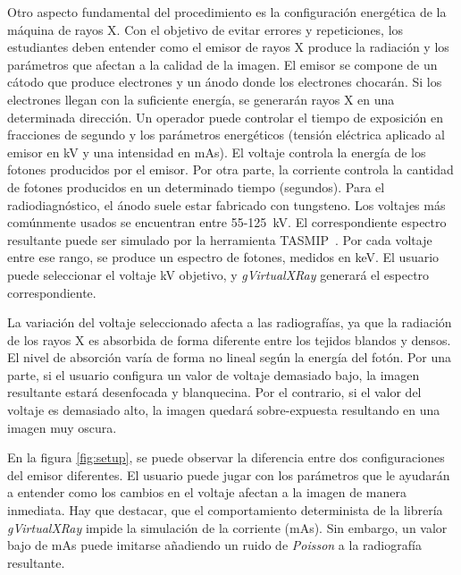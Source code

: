 Otro aspecto fundamental del procedimiento es la configuración energética de la máquina de rayos X. Con el objetivo de evitar errores y repeticiones, los estudiantes deben entender como el emisor de rayos X produce la radiación y los  parámetros que afectan a la calidad de la imagen. El emisor se compone de un cátodo que produce electrones y un ánodo donde los electrones chocarán. Si los electrones llegan con la suficiente energía, se generarán rayos X en una determinada dirección. Un operador puede controlar el tiempo de exposición en fracciones de segundo y los parámetros energéticos (tensión eléctrica aplicado al emisor en \ac{kV} y una intensidad en \ac{mAs}). El voltaje controla la energía de los fotones producidos por el emisor. Por otra parte, la corriente controla la cantidad de fotones producidos en un determinado tiempo (segundos). 
Para el radiodiagnóstico, el ánodo suele estar fabricado con tungsteno. Los voltajes más comúnmente usados se encuentran entre 55-125~\ac{kV}. El correspondiente espectro resultante puede ser simulado por la herramienta \ac{TASMIP}~\cite{Boone1997}. Por cada voltaje entre ese rango, se produce un espectro de fotones, medidos en \ac{keV}. El usuario puede seleccionar el voltaje \ac{kV} objetivo, y \emph{gVirtualXRay} generará el espectro correspondiente.

La variación del voltaje seleccionado afecta a las radiografías, ya que la radiación de los rayos X es absorbida de forma diferente entre los tejidos blandos y densos. El nivel de absorción varía de forma no lineal según la energía del fotón. 
Por una parte, si el usuario configura un valor de voltaje demasiado bajo, la imagen resultante estará desenfocada y blanquecina. Por el contrario, si el valor del voltaje es demasiado alto, la imagen quedará sobre-expuesta resultando en una imagen muy oscura.

En la figura \ref{fig:setup}, se puede observar la diferencia entre dos configuraciones del emisor diferentes. El usuario puede jugar con los parámetros que le ayudarán a entender como los cambios en el voltaje afectan a la imagen de manera inmediata. Hay que destacar, que el comportamiento determinista de la librería \emph{gVirtualXRay} impide la simulación de la corriente (\acs{mAs}). Sin embargo, un valor bajo de \ac{mAs} puede imitarse añadiendo un ruido de \emph{Poisson} a la radiografía resultante.




